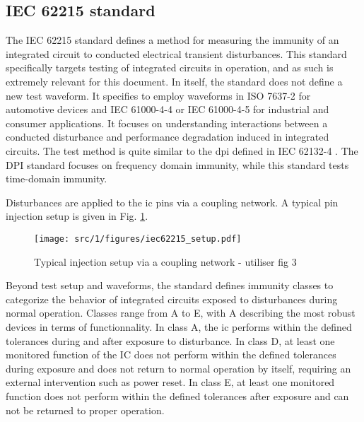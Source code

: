 \subsection{IEC 62215 standard}

The IEC 62215 standard \cite{iec62215} defines a method for measuring the immunity of an integrated circuit to conducted electrical transient disturbances.
This standard specifically targets testing of integrated circuits in operation, and as such is extremely relevant for this document.
In itself, the standard does not define a new test waveform.
It specifies to employ waveforms in ISO 7637-2 \cite{iso7637-2} for automotive devices and IEC 61000-4-4 \cite{iec61000-4-4} or IEC 61000-4-5 for industrial and consumer applications.
It focuses on understanding interactions between a conducted disturbance and performance degradation induced in integrated circuits.
The test method is quite similar to the \gls{dpi} defined in IEC 62132-4 \cite{iec62132-4}.
The DPI standard focuses on frequency domain immunity, while this standard tests time-domain immunity.

Disturbances are applied to the \gls{ic} pins via a coupling network.
A typical pin injection setup is given in Fig. \ref{fig:iec62215_setup}.

\begin{figure}[!h]
  \centering
  \texttt{[image: src/1/figures/iec62215\_setup.pdf]}
  \caption{Typical injection setup via a coupling network - utiliser fig 3}
  \label{fig:iec62215_setup}
\end{figure}

Beyond test setup and waveforms, the standard defines immunity classes to categorize the behavior of integrated circuits exposed to disturbances during normal operation.
Classes range from A to E, with A describing the most robust devices in terms of functionnality.
In class A, the \gls{ic} performs within the defined tolerances during and after exposure to disturbance.
In class D, at least one monitored function of the IC does not perform within the defined tolerances during exposure and does not return to normal operation by itself, requiring an external intervention such as power reset.
In class E, at least one monitored function does not perform within the defined tolerances after exposure and can not be returned to proper operation.
